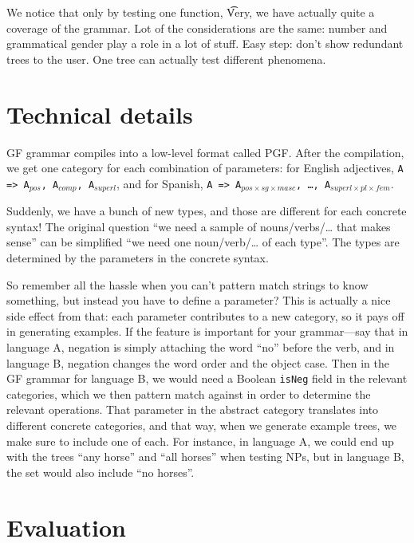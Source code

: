 We notice that only by testing one function, \t{Very}, we have
actually quite a coverage of the grammar. Lot of the considerations
are the same: number and grammatical gender play a role in a lot of
stuff. Easy step: don't show redundant trees to the user. One tree can
actually test different phenomena. 

\section{Technical details}

GF grammar compiles into a low-level format called PGF. After the
compilation, we get one category for each combination of parameters:
for English adjectives, \texttt{A => A$_{pos}$, A$_{comp}$,
A$_{superl}$}, and for Spanish, \texttt{A => A$_{pos×sg×masc}$, \dots,
A$_{superl×pl×fem}$}. 

Suddenly, we have a bunch of new types, and those are different for
each concrete syntax! The original question ``we need a sample of
nouns/verbs/… that makes sense'' can be simplified ``we need one
noun/verb/… of each type''. The types are determined by the parameters
in the concrete syntax. 

So remember all the hassle when you can't pattern match strings to
know something, but instead you have to define a parameter? This is
actually a nice side effect from that: each parameter contributes to a
new category, so it pays off in generating examples. If the feature is
important for your grammar---say that in language A, negation is
simply attaching the word  ``no'' before the verb, and in language B,
negation changes the word order and the object case. Then in the GF
grammar for language B, we would need a Boolean \texttt{isNeg} field
in the relevant categories, which we then pattern match against in
order to determine the relevant operations. That parameter in the
abstract category translates into different concrete categories, and
that way, when we generate example trees, we make sure to include one
of each. For instance, in language A, we could end up with the trees
``any horse'' and ``all horses'' when testing NPs, but in language B,
the set would also include ``no horses''. 



\section{Evaluation}



